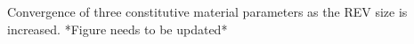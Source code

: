 \label{fig:revconverge} Convergence of three constitutive material parameters as the REV size is increased. *Figure needs to be updated*